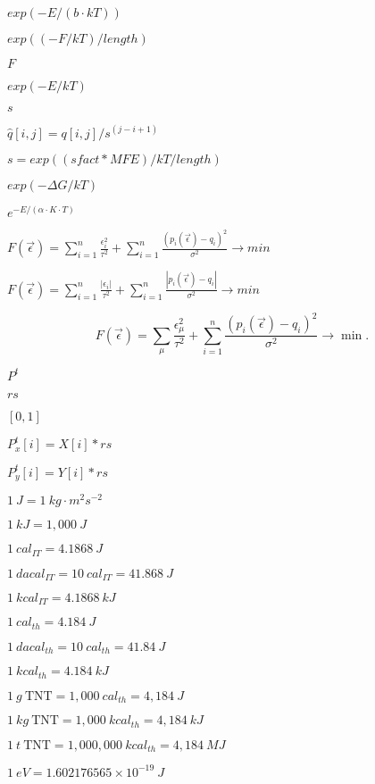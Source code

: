 \documentclass{article}
\begin{document}
$ exp(-E / (b \cdot kT))$
\pagebreak

$exp{((-F/kT)/length)}$
\pagebreak

$F$
\pagebreak

$ exp(-E / kT) $
\pagebreak

$s$
\pagebreak

$\hat{q}[i,j] = q[i,j] / s^{(j-i+1)}$
\pagebreak

$ s = exp((sfact * MFE) / kT / length )$
\pagebreak

$ exp(-\Delta G / kT) $
\pagebreak

$ e^{-E/(\alpha \cdot K \cdot T)} $
\pagebreak

$ F(\vec\epsilon) = \sum_{i = 1}^n{ \frac{\epsilon_i^2}{\tau^2} } + \sum_{i = 1}^n{ \frac{(p_i(\vec\epsilon) - q_i)^2}{\sigma^2} } \to min $
\pagebreak

$ F(\vec\epsilon) = \sum_{i = 1}^n{ \frac{|\epsilon_i|}{\tau^2} } + \sum_{i = 1}^n{ \frac{|p_i(\vec\epsilon) - q_i|}{\sigma^2} } \to min $
\pagebreak

\[ F(\vec\epsilon) = \sum_{\mu}{ \frac{\epsilon_{\mu}^2}{\tau^2} } + \sum_{i = 1}^n{ \frac{(p_i(\vec\epsilon) - q_i)^2}{\sigma^2} } \to \min. \]
\pagebreak

$P^t$
\pagebreak

$rs$
\pagebreak

$[0,1]$
\pagebreak

$ P^{t}_x[i] = X[i] * rs$
\pagebreak

$P^{t}_y[i] = Y[i] * rs$
\pagebreak

$ 1~J = 1~kg \cdot m^2 s^{-2} $
\pagebreak

$ 1~kJ = 1,000~J $
\pagebreak

$ 1~cal_{IT} = 4.1868~J $
\pagebreak

$ 1~dacal_{IT} = 10~cal_{IT} = 41.868~J $
\pagebreak

$ 1~kcal_{IT} = 4.1868~kJ $
\pagebreak

$ 1~cal_{th} = 4.184~J $
\pagebreak

$ 1~dacal_{th} = 10~cal_{th} = 41.84~J $
\pagebreak

$ 1~kcal_{th} = 4.184~kJ $
\pagebreak

$ 1~g~\mathrm{TNT} = 1,000~cal_{th} = 4,184~J $
\pagebreak

$ 1~kg~\mathrm{TNT} = 1,000~kcal_{th} = 4,184~kJ $
\pagebreak

$ 1~t~\mathrm{TNT} = 1,000,000~kcal_{th} = 4,184~MJ $
\pagebreak

$ 1~eV = 1.602176565 \times 10^{-19}~J $
\pagebreak
\end{document}
